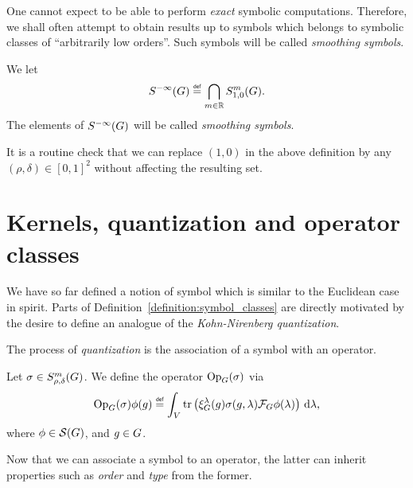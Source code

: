 One cannot expect to be able to perform \emph{exact} symbolic computations.
Therefore,
we shall often attempt to obtain results up to symbols which belongs to symbolic classes of ``arbitrarily low orders''.
Such symbols will be called \emph{smoothing symbols}.

\begin{definition}
\label{definition:smoothing_symbols}
    We let
    \begin{align*}
        \SmoothingSymbols \defeq \bigcap_{m \in \R} \SymbolClass{m}{1, 0}.
    \end{align*}
    The elements of ${S^{-\infty} (G)}$ will be called \emph{smoothing symbols}.
\end{definition}

It is a routine check that we can replace $(1, 0)$ in the above definition
by any $(\rho, \delta) \in [0, 1]^2$ without affecting the resulting set.

\section{Kernels, quantization and operator classes}

We have so far defined a notion of symbol which is similar to the Euclidean case in spirit.
Parts of Definition~\ref{definition:symbol_classes} are directly motivated by the desire to define an analogue of the \emph{Kohn-Nirenberg quantization}.

The process of \emph{quantization} is the association of a symbol with an operator.

\begin{definition}[Quantization]
\label{definition:quantization}
    Let $\sigma \in S^{m}_{\rho, \delta}(G)$.
    We define the operator $\mathrm{Op}_{G}(\sigma)$ via
    \begin{align*}
        \Op(\sigma) \phi(g) \defeq
        \int_\VectorSpace
            \tr\left(\Rep\lambda(g) \sigma(g, \lambda) \Fourier \phi(\lambda)\right)
        \dd \lambda,
    \end{align*}
    where $\phi \in {\mathcal{S} (G)}$, and $g \in G$.
\end{definition}

Now that we can associate a symbol to an operator,
the latter can inherit properties such as \emph{order} and \emph{type} from the former.

